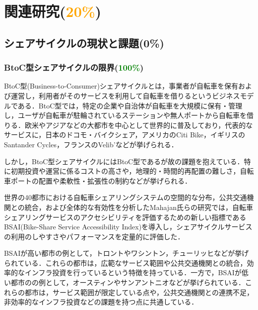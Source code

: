 \section{関連研究(\textcolor{orange}{20\%})}
  \label{sec:関連研究}
    \par
  
  \subsection{シェアサイクルの現状と課題(0\%)}
    \label{sec:シェアサイクルの現状と課題}
      
      \subsubsection{BtoC型シェアサイクルの限界(\textcolor{green}{100\%})}
        \label{sec:BtoC型シェアサイクルの限界}
          \par BtoC型(Business-to-Consumer)シェアサイクルとは，事業者が自転車を保有および運営し，利用者がそのサービスを利用して自転車を借りるというビジネスモデルである．BtoC型では，特定の企業や自治体が自転車を大規模に保有・管理し，ユーザが自転車が駐輪されているステーションや無人ポートから自転車を借りる．欧米やアジアなどの大都市を中心として世界的に普及しており，代表的なサービスに，日本のドコモ・バイクシェア，アメリカのCiti Bike，イギリスのSantander Cycles，フランスのVelib’などが挙げられる．
          \par しかし，BtoC型シェアサイクルにはBtoC型であるが故の課題を抱えている．特に初期投資や運営に係るコストの高さや，地理的・時間的再配置の難しさ，自転車ポートの配置や柔軟性・拡張性の制約などが挙げられる．
          \par 世界の40都市における自転車シェアリングシステムの空間的な分布，公共交通機関との統合，および全体的な有効性を分析したMahajan氏らの研究では，自転車シェアリングサービスのアクセシビリティを評価するための新しい指標であるBSAI(Bike-Share Service Accessibility Index)を導入し，シェアサイクルサービスの利用のしやすさやパフォーマンスを定量的に評価した．
          \par BSAIが高い都市の例として，トロントやワシントン，チューリッヒなどが挙げられている．これらの都市は，広範なサービス範囲や公共交通機関との統合，効率的なインフラ投資を行っているという特徴を持っている．一方で，BSAIが低い都市のの例として，オースティンやサンアントニオなどが挙げられている．これらの都市は，サービス範囲が限定している点や，公共交通機関との連携不足，非効率的なインフラ投資などの課題を持つ点に共通している．

